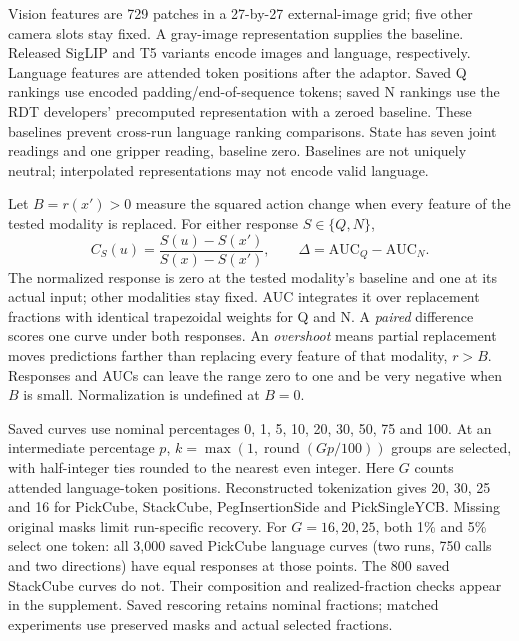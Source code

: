 \documentclass[12pt,letterpaper]{article}
\begin{document}
Vision features are 729 patches in a 27-by-27 external-image grid; five other camera slots stay fixed. A gray-image representation supplies the baseline. Released SigLIP and T5 variants encode images and language, respectively\citep{zhai2023siglip,raffel2020t5}. Language features are attended token positions after the adaptor. Saved Q rankings use encoded padding/end-of-sequence tokens; saved N rankings use the RDT developers' precomputed representation with a zeroed baseline. These baselines prevent cross-run language ranking comparisons. State has seven joint readings and one gripper reading, baseline zero. Baselines are not uniquely neutral\citep{sturmfels2020visualizing}; interpolated representations may not encode valid language\citep{sanyal2021discretized}.

Let $B=r(x')>0$ measure the squared action change when every feature of the tested modality is replaced. For either response $S\in\{Q,N\}$,
\begin{equation}
C_S(u)=\frac{S(u)-S(x')}{S(x)-S(x')},\qquad \Delta=\mathrm{AUC}_Q-\mathrm{AUC}_N.
\label{eq:normalization}
\end{equation}
The normalized response is zero at the tested modality's baseline and one at its actual input; other modalities stay fixed. AUC integrates it over replacement fractions with identical trapezoidal weights for Q and N. A \emph{paired} difference scores one curve under both responses. An \emph{overshoot} means partial replacement moves predictions farther than replacing every feature of that modality, $r>B$. Responses and AUCs can leave the range zero to one and be very negative when $B$ is small. Normalization is undefined at $B=0$.

Saved curves use nominal percentages 0, 1, 5, 10, 20, 30, 50, 75 and 100. At an intermediate percentage $p$, $k=\max(1,\operatorname{round}(Gp/100))$ groups are selected, with half-integer ties rounded to the nearest even integer. Here $G$ counts attended language-token positions. Reconstructed tokenization gives 20, 30, 25 and 16 for PickCube, StackCube, PegInsertionSide and PickSingleYCB. Missing original masks limit run-specific recovery. For $G=16,20,25$, both 1\% and 5\% select one token: all 3,000 saved PickCube language curves (two runs, 750 calls and two directions) have equal responses at those points. The 800 saved StackCube curves do not. Their composition and realized-fraction checks appear in the supplement. Saved rescoring retains nominal fractions; matched experiments use preserved masks and actual selected fractions.
\end{document}
